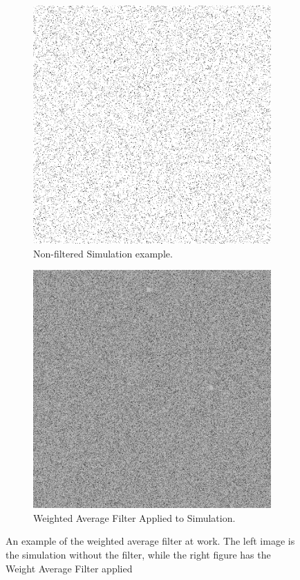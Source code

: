 \documentclass[12pt]{article} %
\begin{document}
\begin{figure}[h]
\begin{subfigure}[t]{.5\textwidth}
\centering
\includegraphics[width=\textwidth]{Sim.png} 
\caption{Non-filtered Simulation example.}
\end{subfigure}
\begin{subfigure}[t]{.5\textwidth}
\centering
\includegraphics[width=\textwidth]{WA.png} 
\caption{Weighted Average Filter Applied to Simulation.}
\end{subfigure}
\caption{An example of the weighted average filter at work. The left image is the simulation without the filter, while the right figure has the Weight Average Filter applied}
\label{fig:WeightedAvg}
\end{figure}
\end{document}
